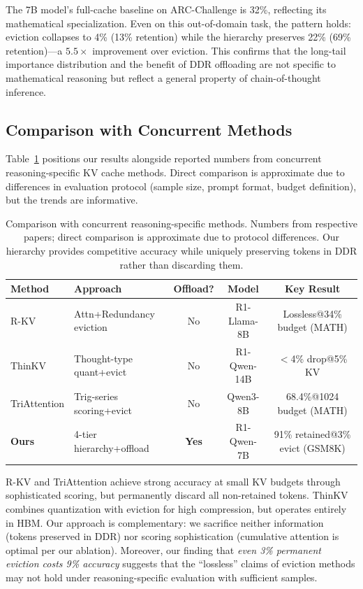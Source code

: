 \documentclass{article}
\begin{document}
The 7B model's full-cache baseline on ARC-Challenge is 32\%, reflecting its mathematical specialization.
Even on this out-of-domain task, the pattern holds: eviction collapses to 4\% (13\% retention) while the hierarchy preserves 22\% (69\% retention)---a $5.5\times$ improvement over eviction.
This confirms that the long-tail importance distribution and the benefit of DDR offloading are not specific to mathematical reasoning but reflect a general property of chain-of-thought inference.

\subsection{Comparison with Concurrent Methods}

Table~\ref{tab:comparison} positions our results alongside reported numbers from concurrent reasoning-specific KV cache methods.
Direct comparison is approximate due to differences in evaluation protocol (sample size, prompt format, budget definition), but the trends are informative.

\begin{table}[t]
\centering
\caption{Comparison with concurrent reasoning-specific methods. Numbers from respective papers; direct comparison is approximate due to protocol differences. Our hierarchy provides competitive accuracy while uniquely preserving tokens in DDR rather than discarding them.}
\label{tab:comparison}
\vskip 0.1in
\small
\begin{tabular}{llccc}
\toprule
\textbf{Method} & \textbf{Approach} & \textbf{Offload?} & \textbf{Model} & \textbf{Key Result} \\
\midrule
R-KV & Attn+Redundancy eviction & No & R1-Llama-8B & Lossless@34\% budget (MATH) \\
ThinKV & Thought-type quant+evict & No & R1-Qwen-14B & $<$4\% drop@5\% KV \\
TriAttention & Trig-series scoring+evict & No & Qwen3-8B & 68.4\%@1024 budget (MATH) \\
\midrule
\textbf{Ours} & 4-tier hierarchy+offload & \textbf{Yes} & R1-Qwen-7B & 91\% retained@3\% evict (GSM8K) \\
\bottomrule
\end{tabular}
\end{table}

R-KV and TriAttention achieve strong accuracy at small KV budgets through sophisticated scoring, but permanently discard all non-retained tokens.
ThinKV combines quantization with eviction for high compression, but operates entirely in HBM.
Our approach is complementary: we sacrifice neither information (tokens preserved in DDR) nor scoring sophistication (cumulative attention is optimal per our ablation).
Moreover, our finding that \emph{even 3\% permanent eviction costs 9\% accuracy} suggests that the ``lossless'' claims of eviction methods may not hold under reasoning-specific evaluation with sufficient samples.
\end{document}
